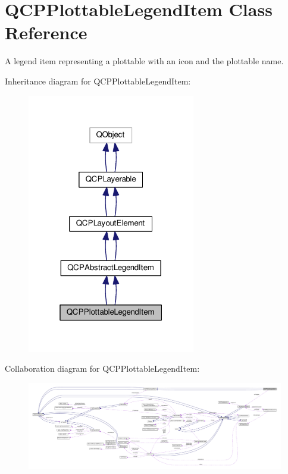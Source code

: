 \hypertarget{class_q_c_p_plottable_legend_item}{}\section{Q\+C\+P\+Plottable\+Legend\+Item Class Reference}
\label{class_q_c_p_plottable_legend_item}


A legend item representing a plottable with an icon and the plottable name.  




Inheritance diagram for Q\+C\+P\+Plottable\+Legend\+Item\+:\nopagebreak
\begin{figure}[H]
\begin{center}
\leavevmode
\includegraphics[width=208pt]{class_q_c_p_plottable_legend_item__inherit__graph}
\end{center}
\end{figure}


Collaboration diagram for Q\+C\+P\+Plottable\+Legend\+Item\+:\nopagebreak
\begin{figure}[H]
\begin{center}
\leavevmode
\includegraphics[width=350pt]{class_q_c_p_plottable_legend_item__coll__graph}
\end{center}
\end{figure}
